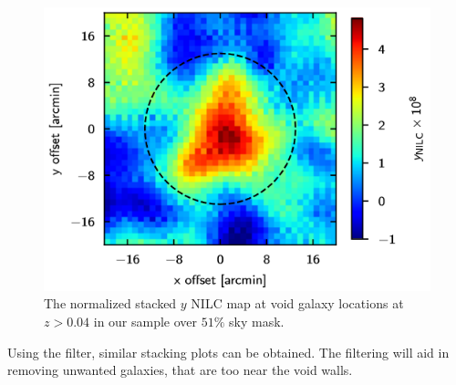 \begin{figure}[h!]
	\centering
	\includegraphics{fig3-2.png}
	\caption{The normalized stacked $ y $ NILC map at void galaxy locations at $ z > 0.04 $ in our sample over $ 51\% $ sky mask.}
\end{figure}
Using the filter, similar stacking plots can be obtained. The filtering will aid in removing unwanted galaxies, that are too near the void walls. 
\setcounter{equation}{0}
\setcounter{table}{0}
\setcounter{figure}{0}


    



